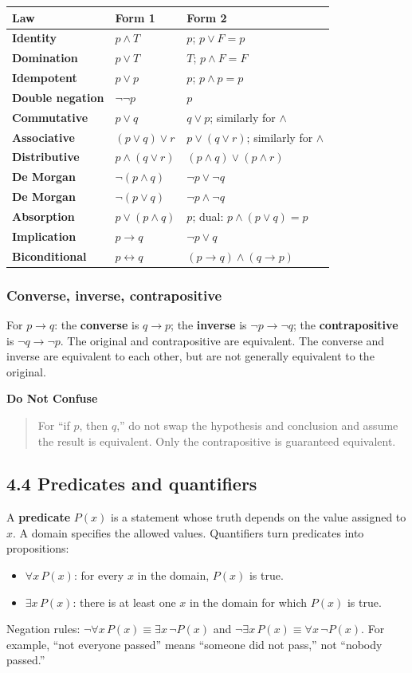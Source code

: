 \documentclass[11pt,a4paper]{article}
\newenvironment{dangerbox}{\par\medskip\noindent\color{red}\textbf{Do Not Confuse}\par\smallskip\color{black}\begin{quote}}{\end{quote}\medskip}
\begin{document}
\begin{center}\small
\begin{tabularx}{\textwidth}{>{\bfseries}p{} X X}
\toprule Law & Form 1 & Form 2\\\midrule
Identity & $p\land T$ & $p$; \quad $p\lor F=p$\\
Domination & $p\lor T$ & $T$; \quad $p\land F=F$\\
Idempotent & $p\lor p$ & $p$; \quad $p\land p=p$\\
Double negation & $\neg\neg p$ & $p$\\
Commutative & $p\lor q$ & $q\lor p$; similarly for $\land$\\
Associative & $(p\lor q)\lor r$ & $p\lor(q\lor r)$; similarly for $\land$\\
Distributive & $p\land(q\lor r)$ & $(p\land q)\lor(p\land r)$\\
De Morgan & $\neg(p\land q)$ & $\neg p\lor\neg q$\\
De Morgan & $\neg(p\lor q)$ & $\neg p\land\neg q$\\
Absorption & $p\lor(p\land q)$ & $p$; dual: $p\land(p\lor q)=p$\\
Implication & $p\to q$ & $\neg p\lor q$\\
Biconditional & $p\leftrightarrow q$ & $(p\to q)\land(q\to p)$\\
\bottomrule
\end{tabularx}\end{center}

\subsubsection{Converse, inverse, contrapositive}
For $p\to q$: the \textbf{converse} is $q\to p$; the \textbf{inverse} is $\neg p\to\neg q$; the \textbf{contrapositive} is $\neg q\to\neg p$. The original and contrapositive are equivalent. The converse and inverse are equivalent to each other, but are not generally equivalent to the original.

\begin{dangerbox}For “if $p$, then $q$,” do not swap the hypothesis and conclusion and assume the result is equivalent. Only the contrapositive is guaranteed equivalent.\end{dangerbox}

\subsection{4.4 Predicates and quantifiers}
A \textbf{predicate} $P(x)$ is a statement whose truth depends on the value assigned to $x$. A domain specifies the allowed values. Quantifiers turn predicates into propositions:
\begin{itemize}
\item $\forall x\,P(x)$: for every $x$ in the domain, $P(x)$ is true.
\item $\exists x\,P(x)$: there is at least one $x$ in the domain for which $P(x)$ is true.
\end{itemize}
Negation rules: $\neg\forall x\,P(x)\equiv\exists x\,\neg P(x)$ and $\neg\exists x\,P(x)\equiv\forall x\,\neg P(x)$. For example, “not everyone passed” means “someone did not pass,” not “nobody passed.”
\end{document}
